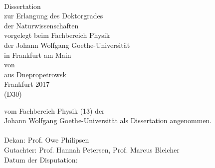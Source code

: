 \thispagestyle{empty}%
\begin{center}%
  \vspace*{\frontmattertitleskip}%
  \begin{doublespace}%
    {\Huge\textbf{\thetitle}}\\%
  \end{doublespace}%
  \vspace*{2cm}%
  \Large{{Dissertation \\
          zur Erlangung des Doktorgrades \\
          der Naturwissenschaften} }\\%
  \vspace*{2cm}%
  \Large{{vorgelegt beim Fachbereich Physik \\
         der Johann Wolfgang Goethe-Universit\"at \\
         in Frankfurt am Main} }\\%
  \vspace*{1cm}%
  \Large{{von {\theauthor} \\ aus Dnepropetrowsk} }\\
  \vspace*{1cm}%
  \Large{{Frankfurt 2017 \\ (D30)}}
\end{center}%

\newpage
\thispagestyle{empty}%
\vspace*{0.4\textheight}
\noindent
{vom Fachbereich Physik (13) der \\
Johann Wolfgang Goethe-Universit\"at als Dissertation angenommen.}\\
\vspace{5cm} \\
{Dekan:  Prof. Owe Philipsen\\
 Gutachter:  Prof. Hannah Petersen, Prof. Marcus Bleicher\\
 Datum der Disputation: }

